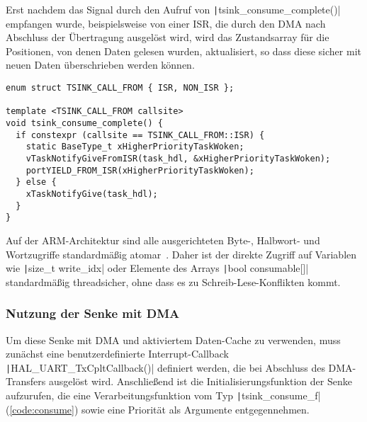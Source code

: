 Erst nachdem das Signal durch den Aufruf von
\texttt|tsink_consume_complete()| empfangen wurde, beispielsweise von
einer ISR, die durch den DMA nach Abschluss der Übertragung ausgelöst wird, wird
das Zustandsarray für die Positionen, von denen Daten gelesen wurden,
aktualisiert, so dass diese sicher mit neuen Daten überschrieben werden können.

\begin{code}
\begin{verbatim}
enum struct TSINK_CALL_FROM { ISR, NON_ISR };

template <TSINK_CALL_FROM callsite>
void tsink_consume_complete() {
  if constexpr (callsite == TSINK_CALL_FROM::ISR) {
    static BaseType_t xHigherPriorityTaskWoken;
    vTaskNotifyGiveFromISR(task_hdl, &xHigherPriorityTaskWoken);
    portYIELD_FROM_ISR(xHigherPriorityTaskWoken);
  } else {
    xTaskNotifyGive(task_hdl);
  }
}
\end{verbatim}
\end{code}

Auf der ARM-Architektur sind alle ausgerichteten Byte-, Halbwort- und
Wortzugriffe standardmäßig atomar~\cite[S. A3-79]{ARM_DDI0403_EE}. Daher ist der
direkte Zugriff auf Variablen wie \texttt|size_t write_idx| oder
Elemente des Arrays \texttt|bool consumable[]| standardmäßig
threadsicher, ohne dass es zu Schreib-Lese-Konflikten kommt.

\subsubsection{Nutzung der Senke mit DMA}

Um diese Senke mit DMA und aktiviertem Daten-Cache zu verwenden, muss zunächst
eine benutzerdefinierte Interrupt-Callback
\texttt|HAL_UART_TxCpltCallback()| definiert werden, die bei Abschluss
des DMA-Transfers ausgelöst wird. Anschließend ist die Initialisierungsfunktion
der Senke aufzurufen, die eine Verarbeitungsfunktion vom Typ
\texttt|tsink_consume_f| (\ref{code:consume}) sowie eine Priorität als
Argumente entgegennehmen.

